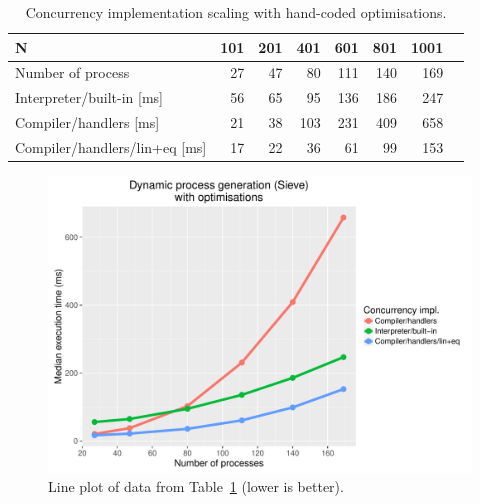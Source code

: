 \documentclass[12pt,mscres,cdtppar,twoside,openright,logo,rightchapter,normalheadings]{infthesis}
\theoremstyle{definition}
\begin{document}
\begin{table}
\centering
\begin{tabular}{| l | r | r | r | r | r | r | r |}
\hline
N  & 101 & 201 & 401 & 601 & 801 & 1001 \\
\hline
Number of process & 27 & 47 & 80 & 111 & 140 & 169 \\
\hline
\hline
  Interpreter/built-in [ms] & 56 & 65 & 95 & 136 & 186 & 247 \\
\hline
  Compiler/handlers [ms] & 21 & 38 & 103 & 231  & 409  & 658  \\
\hline 
  Compiler/handlers/lin+eq [ms] & 17 & 22 & 36 & 61 & 99 & 153 \\
\hline
\end{tabular}
\caption{Concurrency implementation scaling with hand-coded optimisations.}\label{tbl:sieve-recovered}
\end{table}

\begin{figure}[H]
\centering
\includegraphics[scale=0.55]{plots/sieve_recovered.pdf}
\caption{Line plot of data from Table~\ref{tbl:sieve-recovered} (lower
  is better).}\label{fig:sieve-recovered-plot}
\end{figure}

\end{document}
